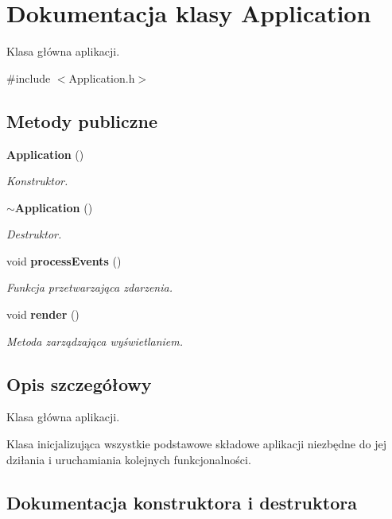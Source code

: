 \section{Dokumentacja klasy Application}
\label{class_application}


Klasa główna aplikacji.  




{\ttfamily \#include $<$Application.\+h$>$}

\subsection*{Metody publiczne}
\begin{DoxyCompactItemize}
\item 
\textbf{ Application} ()
\begin{DoxyCompactList}\small\item\em Konstruktor. \end{DoxyCompactList}\item 
\textbf{ $\sim$\+Application} ()
\begin{DoxyCompactList}\small\item\em Destruktor. \end{DoxyCompactList}\item 
void \textbf{ process\+Events} ()
\begin{DoxyCompactList}\small\item\em Funkcja przetwarzająca zdarzenia. \end{DoxyCompactList}\item 
void \textbf{ render} ()
\begin{DoxyCompactList}\small\item\em Metoda zarządzająca wyświetlaniem. \end{DoxyCompactList}\end{DoxyCompactItemize}


\subsection{Opis szczegółowy}
Klasa główna aplikacji. 

Klasa inicjalizująca wszystkie podstawowe składowe aplikacji niezbędne do jej dziłania i uruchamiania kolejnych funkcjonalności. 

\subsection{Dokumentacja konstruktora i destruktora}
\mbox{\label{class_application_afa8cc05ce6b6092be5ecdfdae44e05f8}} 
